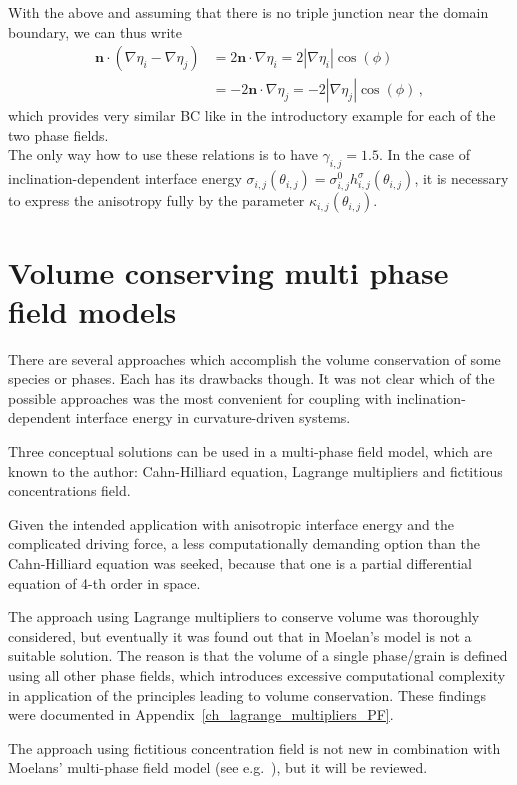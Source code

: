 With the above and assuming that there is no triple junction near the domain boundary, we can thus write
\begin{equation}
	\begin{split}
		\bm{n}\cdot(\nabla\eta_i-\nabla\eta_j) &= 2\bm{n}\cdot\nabla\eta_i = 2|\nabla\eta_i|\cos(\phi) \\ &= -2\bm{n}\cdot\nabla\eta_j = -2|\nabla\eta_j|\cos(\phi) \,,
	\end{split}
\end{equation}
which provides very similar BC like in the introductory example for each of the two phase fields.\\
The only way how to use these relations is to have $\gamma_{i,j}=1.5$. In the case of inclination-dependent interface energy $\sigma_{i,j}(\theta_{i,j})=\sigma_{i,j}^0h_{i,j}^\sigma(\theta_{i,j})$, it is necessary to express the anisotropy fully by the parameter $\kappa_{i,j}(\theta_{i,j})$. 

\section{Volume conserving multi phase field models}
There are several approaches which accomplish the volume conservation of some species or phases. Each has its drawbacks though. It was not clear which of the possible approaches was the most convenient for coupling with inclination-dependent interface energy in curvature-driven systems.

Three conceptual solutions can be used in a multi-phase field model, which are known to the author: Cahn-Hilliard equation, Lagrange multipliers and fictitious concentrations field. 

Given the intended application with anisotropic interface energy and the complicated driving force, a less computationally demanding option than the Cahn-Hilliard equation was seeked, because that one is a partial differential equation of 4-th order in space. 

The approach using Lagrange multipliers to conserve volume was thoroughly considered, but eventually it was found out that in Moelan's model is not a suitable solution. The reason is that the volume of a single phase/grain is defined using all other phase fields, which introduces excessive computational complexity in application of the principles leading to volume conservation. These findings were documented in Appendix~\ref{ch_lagrange_multipliers_PF}.

The approach using fictitious concentration field is not new in combination with Moelans' multi-phase field model (see e.g.~\cite{Yadav2016,Yadav2018vol_cons}), but it will be reviewed.

